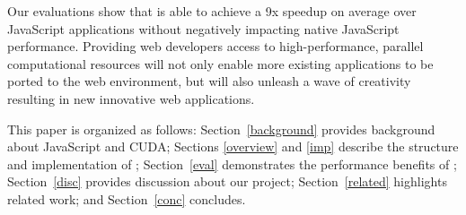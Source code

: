 Our evaluations show that \name is able to achieve a 9x speedup on average over
JavaScript applications without negatively impacting native JavaScript performance.
Providing web developers access to high-performance, parallel computational
resources will not only enable more existing applications to be ported to the
web environment, but will also unleash a wave of creativity resulting in new
innovative web applications.

This paper is organized as follows: Section~\ref{background} provides background
about JavaScript and CUDA; Sections \ref{overview} and \ref{imp} describe the
structure and implementation of \namens; Section~\ref{eval} demonstrates the
performance benefits of \namens; Section~\ref{disc} provides discussion
about our project; Section~\ref{related} highlights related work; and
Section~\ref{conc} concludes.

